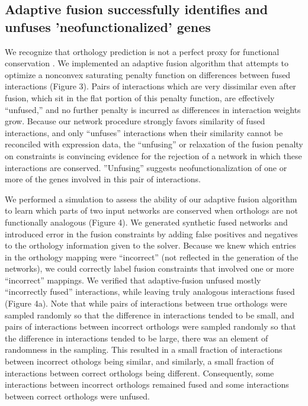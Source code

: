 \documentclass[11pt]{article}
\begin{document}
\subsection{Adaptive fusion successfully identifies and unfuses 'neofunctionalized' genes}
We recognize that orthology prediction is not a perfect proxy for functional conservation \cite{gabaldon_functional_2013, studer_how_2009, nehrt_testing_2011}. We implemented an adaptive fusion algorithm that attempts to optimize a nonconvex saturating penalty function on differences between fused interactions (Figure 3). Pairs of interactions which are very dissimilar even after fusion, which sit in the flat portion of this penalty function, are effectively ``unfused,'' and no further penalty is incurred as differences in interaction weights grow. Because our network procedure strongly favors similarity of fused interactions, and only ``unfuses'' interactions when their similarity cannot be reconciled with expression data, the ``unfusing'' or relaxation of the fusion penalty on constraints is convincing evidence for the rejection of a network in which these interactions are conserved. ''Unfusing'' suggests neofunctionalization of one or more of the genes involved in this pair of interactions.

We performed a simulation to assess the ability of our adaptive fusion algorithm to learn which parts of two input networks are conserved when orthologs are not functionally analogous  (Figure 4). We generated synthetic fused networks and introduced error in the fusion constraints by adding false positives and negatives to the orthology information given to the solver. Because we knew which entries in the orthology mapping were ``incorrect'' (not reflected in the generation of the networks), we could correctly label fusion constraints that involved one or more ``incorrect'' mappings. We verified that adaptive-fusion unfused mostly ``incorrectly fused'' interactions, while leaving truly analogous interactions fused (Figure 4a). Note that while pairs of interactions between true orthologs were sampled randomly so that the difference in interactions tended to be small, and pairs of interactions between incorrect orthologs were sampled randomly so that the difference in interactions tended to be large, there was an element of randomness in the sampling. This resulted in a small fraction of interactions between incorrect othologs being similar, and similarly, a small fraction of interactions between correct orthologs being different. Consequently, some interactions between incorrect orthologs remained fused and some interactions between correct orthologs were unfused. 
\end{document}
